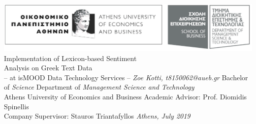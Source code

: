 \documentclass[dvips, letterpaper, 12pt]{report}
\begin{document}
\sloppy


\thesistitle
    {\includegraphics[width=\textwidth]{aueb_logo.eps}}
	{Implementation of Lexicon-based Sentiment \\
	\vspace{3mm}
	 Analysis on Greek Text Data \\
	\vspace{1cm}
	 -- at isMOOD Data Technology Services --}
	{\emph{Zoe Kotti, t8150062@aueb.gr}}
	{Bachelor of \emph{Science}}
	{Department of \emph{Management Science and Technology} \\
     Athens University of Economics and Business}
	{Academic Advisor: Prof. Diomidis Spinellis \\
     Company Supervisor: Stauros Triantafyllos}
    {\emph{Athens, July 2019}}




\tableofcontents













\appendix

\end{document}
